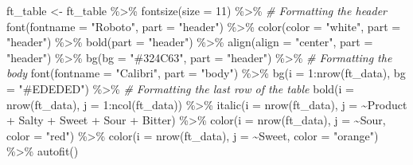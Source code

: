 \documentclass[
]{krantz}
\makeatletter
\newenvironment{Shaded}{\begin{snugshade}}{\end{snugshade}}
\newcommand{\AttributeTok}[1]{\textcolor[rgb]{0.61,0.61,0.61}{#1}}
\newcommand{\CommentTok}[1]{\textcolor[rgb]{0.37,0.37,0.37}{\textit{#1}}}
\newcommand{\DecValTok}[1]{\textcolor[rgb]{0.06,0.06,0.06}{#1}}
\newcommand{\FunctionTok}[1]{\textcolor[rgb]{0,0,0}{#1}}
\newcommand{\NormalTok}[1]{#1}
\newcommand{\OtherTok}[1]{\textcolor[rgb]{0.37,0.37,0.37}{#1}}
\newcommand{\SpecialCharTok}[1]{\textcolor[rgb]{0,0,0}{#1}}
\newcommand{\StringTok}[1]{\textcolor[rgb]{0.5,0.5,0.5}{#1}}
\newenvironment{kframe}{%
\medskip{}
\setlength{\fboxsep}{.8em}
 \def\at@end@of@kframe{}%
 \ifinner\ifhmode%
  \def\at@end@of@kframe{\end{minipage}}%
  \begin{minipage}{\columnwidth}%
 \fi\fi%
 \def\FrameCommand##1{\hskip\@totalleftmargin \hskip-\fboxsep
 \colorbox{shadecolor}{##1}\hskip-\fboxsep
     \hskip-\linewidth \hskip-\@totalleftmargin \hskip\columnwidth}%
 \MakeFramed {\advance\hsize-\width
   \@totalleftmargin\z@ \linewidth\hsize
   \@setminipage}}%
 {\par\unskip\endMakeFramed%
 \at@end@of@kframe}
\renewenvironment{Shaded}{\begin{kframe}}{\end{kframe}}
\makeatother
\begin{document}
\begin{Shaded}
\begin{Highlighting}[]
\NormalTok{ft\_table }\OtherTok{\textless{}{-}}\NormalTok{ ft\_table }\SpecialCharTok{\%\textgreater{}\%} 
  \FunctionTok{fontsize}\NormalTok{(}\AttributeTok{size =} \DecValTok{11}\NormalTok{) }\SpecialCharTok{\%\textgreater{}\%}
  \CommentTok{\# Formatting the header}
  \FunctionTok{font}\NormalTok{(}\AttributeTok{fontname =} \StringTok{"Roboto"}\NormalTok{, }\AttributeTok{part =} \StringTok{"header"}\NormalTok{) }\SpecialCharTok{\%\textgreater{}\%}
  \FunctionTok{color}\NormalTok{(}\AttributeTok{color =} \StringTok{"white"}\NormalTok{, }\AttributeTok{part =} \StringTok{"header"}\NormalTok{) }\SpecialCharTok{\%\textgreater{}\%}
  \FunctionTok{bold}\NormalTok{(}\AttributeTok{part =} \StringTok{"header"}\NormalTok{) }\SpecialCharTok{\%\textgreater{}\%}
  \FunctionTok{align}\NormalTok{(}\AttributeTok{align =} \StringTok{"center"}\NormalTok{, }\AttributeTok{part =} \StringTok{"header"}\NormalTok{) }\SpecialCharTok{\%\textgreater{}\%}
  \FunctionTok{bg}\NormalTok{(}\AttributeTok{bg =} \StringTok{"\#324C63"}\NormalTok{, }\AttributeTok{part =} \StringTok{"header"}\NormalTok{) }\SpecialCharTok{\%\textgreater{}\%}
  \CommentTok{\# Formatting the body}
  \FunctionTok{font}\NormalTok{(}\AttributeTok{fontname =} \StringTok{"Calibri"}\NormalTok{, }\AttributeTok{part =} \StringTok{"body"}\NormalTok{) }\SpecialCharTok{\%\textgreater{}\%} 
  \FunctionTok{bg}\NormalTok{(}\AttributeTok{i =} \DecValTok{1}\SpecialCharTok{:}\FunctionTok{nrow}\NormalTok{(ft\_data), }\AttributeTok{bg =} \StringTok{"\#EDEDED"}\NormalTok{) }\SpecialCharTok{\%\textgreater{}\%} 
  \CommentTok{\# Formatting the last row of the table}
  \FunctionTok{bold}\NormalTok{(}\AttributeTok{i =} \FunctionTok{nrow}\NormalTok{(ft\_data), }\AttributeTok{j =} \DecValTok{1}\SpecialCharTok{:}\FunctionTok{ncol}\NormalTok{(ft\_data)) }\SpecialCharTok{\%\textgreater{}\%} 
  \FunctionTok{italic}\NormalTok{(}\AttributeTok{i =} \FunctionTok{nrow}\NormalTok{(ft\_data), }\AttributeTok{j =} \SpecialCharTok{\textasciitilde{}}\NormalTok{Product }\SpecialCharTok{+}\NormalTok{ Salty }\SpecialCharTok{+}\NormalTok{ Sweet }\SpecialCharTok{+}\NormalTok{ Sour }\SpecialCharTok{+}\NormalTok{ Bitter) }\SpecialCharTok{\%\textgreater{}\%}
  \FunctionTok{color}\NormalTok{(}\AttributeTok{i =}  \FunctionTok{nrow}\NormalTok{(ft\_data), }\AttributeTok{j =} \SpecialCharTok{\textasciitilde{}}\NormalTok{Sour, }\AttributeTok{color =} \StringTok{"red"}\NormalTok{) }\SpecialCharTok{\%\textgreater{}\%}
  \FunctionTok{color}\NormalTok{(}\AttributeTok{i =}  \FunctionTok{nrow}\NormalTok{(ft\_data), }\AttributeTok{j =} \SpecialCharTok{\textasciitilde{}}\NormalTok{Sweet, }\AttributeTok{color =} \StringTok{"orange"}\NormalTok{) }\SpecialCharTok{\%\textgreater{}\%} 
  \FunctionTok{autofit}\NormalTok{()}


\end{Highlighting}
\end{Shaded}
\end{document}
